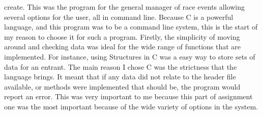\documentclass[a4paper]{article}
\begin{document}
create. This was the program for the general manager of race events allowing
several options for the user, all in command line. 
Because C is a powerful language, and this program was to be a command line
system, this is the start of my reason to choose it for such a program. Firstly,
the simplicity of moving around and checking data was ideal for the wide range
of functions that are implemented. 
For instance, using Structures in C was a easy way to store sets of data for an
entrant. The main reason I chose C was the strictness that the language brings.
It meant that if any data did not relate to the header file available, or
methods were implemented that 
should be, the program would report an error. This was very important to me
because this part of assignment one was the most important because of the wide
variety of options in the system.
 
\end{document}
